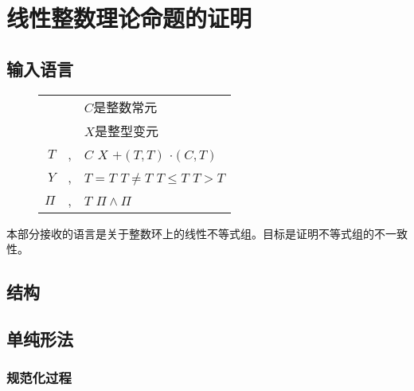 \chapter{线性整数理论命题的证明}
\label{chap:lia}

\section{输入语言}
\begin{figure}[!htbp]
  \centering
  \begin{tabular}[rcl]{rcl}
    & & $C$是整数常元 \\
    & & $X$是整型变元 \\
    $T$ & \sep{} & $C$ \deli{} $X$ \deli{} $+(T, T)$ \deli{} $\cdot(C, T)$ \\
    $Y$ & \sep{} & $T = T$ \deli{} $T \neq T$ \deli{} $T \leq T$ \deli{} $T > T$ \\
    $\Pi$ & \sep{} & $T$ \deli{} $\Pi \land \Pi$ \\
  \end{tabular}
\end{figure}
本部分接收的语言是关于整数环上的线性不等式组。目标是证明不等式组的不一致性。

\section{结构}
\section{单纯形法}
\subsection{规范化过程}
